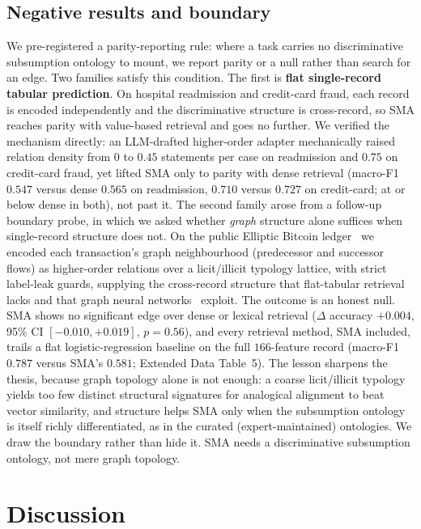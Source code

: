 \documentclass[pdflatex,sn-nature]{sn-jnl}
\begin{document}
\subsection{Negative results and boundary}
 We pre-registered a parity-reporting
rule: where a task carries no discriminative subsumption ontology to mount, we
report parity or a null rather than search for an edge. Two families satisfy this
condition. The first is \textbf{flat single-record tabular prediction}. On
hospital readmission and credit-card fraud, each record is encoded independently
and the discriminative structure is cross-record, so SMA reaches parity with
value-based retrieval and goes no further. We verified the mechanism directly: an
LLM-drafted higher-order adapter mechanically raised relation density from $0$ to
$0.45$ statements per case on readmission and $0.75$ on credit-card fraud, yet
lifted SMA only to parity with dense retrieval (macro-F1 $0.547$ versus dense
$0.565$ on readmission, $0.710$ versus $0.727$ on credit-card; at or below dense
in both), not past it. The second family
arose from a follow-up boundary probe, in which we asked whether \emph{graph}
structure alone suffices when single-record structure does not. On the public
Elliptic Bitcoin ledger~\cite{weber2019elliptic} we encoded each transaction's
graph neighbourhood (predecessor and successor flows) as higher-order relations
over a licit/illicit typology lattice, with strict label-leak guards, supplying
the cross-record structure that flat-tabular retrieval lacks and that graph neural
networks~\cite{kipf2017gcn} exploit. The outcome is an honest null. SMA shows no
significant edge over dense or lexical retrieval ($\Delta$ accuracy $+0.004$,
95\% CI $[-0.010,+0.019]$, $p{=}0.56$), and every retrieval method, SMA included,
trails a flat logistic-regression baseline on the full $166$-feature record
(macro-F1 $0.787$ versus SMA's $0.581$; Extended Data Table~5). The lesson
sharpens the thesis, because graph topology alone is not enough: a coarse
licit/illicit typology yields too few distinct structural signatures for
analogical alignment to beat vector similarity, and structure helps SMA only when
the subsumption ontology is itself richly differentiated, as in the curated
(expert-maintained) ontologies. We draw the boundary rather than hide it. SMA
needs a discriminative subsumption ontology, not mere graph topology.

\section{Discussion}\label{sec:discussion}
\end{document}
